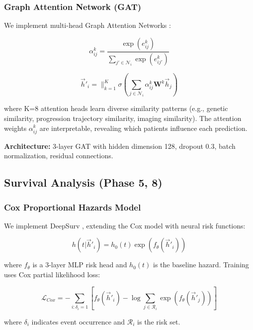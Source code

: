 \documentclass[conference]{IEEEtran}
\begin{document}
\subsubsection{Graph Attention Network (GAT)}
We implement multi-head Graph Attention Networks \cite{velickovic2018graph}:

\begin{equation}
\alpha_{ij}^k = \frac{\exp(e_{ij}^k)}{\sum_{j' \in \mathcal{N}_i} \exp(e_{ij'}^k)}
\end{equation}

\begin{equation}
\vec{h}'_i = \|_{k=1}^K \sigma\left(\sum_{j \in \mathcal{N}_i} \alpha_{ij}^k \mathbf{W}^k\vec{h}_j\right)
\end{equation}

where K=8 attention heads learn diverse similarity patterns (e.g., genetic similarity, progression trajectory similarity, imaging similarity). The attention weights $\alpha_{ij}^k$ are interpretable, revealing which patients influence each prediction.

\textbf{Architecture:} 3-layer GAT with hidden dimension 128, dropout 0.3, batch normalization, residual connections.

\subsection{Survival Analysis (Phase 5, 8)}

\subsubsection{Cox Proportional Hazards Model}
We implement DeepSurv \cite{katzman2018deepsurv}, extending the Cox model with neural risk functions:

\begin{equation}
h(t|\vec{h}'_i) = h_0(t) \exp(f_\theta(\vec{h}'_i))
\end{equation}

where $f_\theta$ is a 3-layer MLP risk head and $h_0(t)$ is the baseline hazard. Training uses Cox partial likelihood loss:

\begin{equation}
\mathcal{L}_{Cox} = -\sum_{i: \delta_i=1} \left[f_\theta(\vec{h}'_i) - \log\sum_{j \in \mathcal{R}_i} \exp(f_\theta(\vec{h}'_j))\right]
\end{equation}

where $\delta_i$ indicates event occurrence and $\mathcal{R}_i$ is the risk set.
\end{document}
